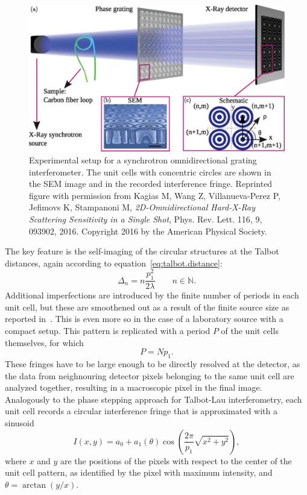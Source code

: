 \begin{figure}[htb]
    \centering
    \includegraphics[width=\textwidth]{gfx/omnidirectional/synchrotron-design.png}
    \caption[Synchrotron experimental setup for omnidirectional grating
    interferometry.]{Experimental setup for a synchrotron omnidirectional grating
    interferometer. The unit cells with concentric circles are shown in the
    \ac{SEM} image and in the recorded interference fringe. Reprinted figure
with permission from Kagias M, Wang Z, Villanueva-Perez P, Jefimovs K,
Stampanoni M, \emph{2D-Omnidirectional Hard-X-Ray Scattering Sensitivity in
a Single Shot}, Phys. Rev. Lett. 116, 9, 093902, 2016. Copyright 2016 by the
American Physical Society.}
    \label{fig:omnidirectional-synchrotron}
\end{figure}

The key feature is the self-imaging of the circular structures 
at the Talbot distances, again according to
equation~\ref{eq:talbot.distance}:
\begin{equation*}
    \Delta_n = n \frac{p_1^2}{2 \lambda} \qquad n \in
    \mathbb{N}.
\end{equation*}
Additional imperfections are introduced by the finite number of periods in
each unit cell, but these are smoothened out as a result of the finite
source size as reported in~\cite{PhysRevLett.116.093902}. This is even
more so in the case of a laboratory source with a compact setup.
This pattern is replicated with a period $P$ of the unit cells themselves,
for which
\begin{equation}
    P = Np_1.
    \label{eq:unit.cell.periop}
\end{equation}
These fringes have to be large enough to be directly resolved at the
detector, as the data from neighnouring detector pixels belonging to the same
unit cell are analyzed together, resulting in a macroscopic pixel in the final image. Analogously to
the phase stepping approach for Talbot-Lau interferometry, each unit cell
records a circular interference fringe that is approximated with a sinusoid
\begin{equation}
    I(x, y) = a_0 + a_1(\theta)\cos\left(\frac{2\pi}{p_1} \sqrt{x^2 +
    y^2}\right),
    \label{eq:omnidirectional.periodical.signal}
\end{equation}
where $x$ and $y$ are the positions of the pixels with respect to the center
of the unit cell pattern, as identified by the pixel with maximum intensity,
and $\theta = \arctan(y/x)$.

